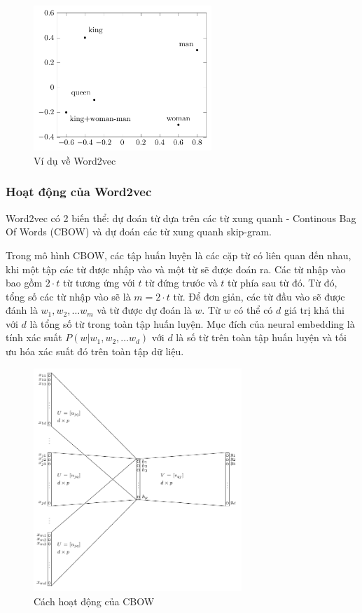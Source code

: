 \begin{figure}[htb]
    \centering
    \includegraphics[width=0.6\textwidth]{tikz_image/word2vec_example.pdf}
    \caption{Ví dụ về Word2vec}
    \label{figure:word2vec-example}
\end{figure}

\subsubsection{Hoạt động của Word2vec}
Word2vec có 2 biến thể: dự đoán từ dựa trên các từ xung quanh - Continous Bag Of Words (CBOW) và dự đoán các từ xung quanh skip-gram.

Trong mô hình CBOW, các tập huấn luyện là các cặp từ có liên quan đến nhau, khi một tập các từ được nhập vào và một từ sẽ được đoán ra. Các từ nhập vào bao gồm $2\cdot t$ từ tương ứng với $t$ từ đứng trước và $t$ từ phía sau từ đó. Từ đó, tổng số các từ nhập vào sẽ là $m = 2\cdot t$ từ. Để đơn giản, các từ đầu vào sẽ được đánh là $w_1, w_2,\dots w_m$  và từ được dự đoán là $w$. Từ $w$ có thể có $d$ giá trị khả thi với $d$ là tổng số từ trong toàn tập huấn luyện. Mục đích của neural embedding là tính xác suất $P(w|w_1,w_2,\dots w_d)$ với $d$ là số từ trên toàn tập huấn luyện và tối ưu hóa xác suất đó trên toàn tập dữ liệu.
\begin{figure}[htbp]
    \centering
    \includegraphics[width=0.7\textwidth]{tikz_image/word2vec_cbow.pdf}
    \caption{Cách hoạt động của CBOW \cite{Aggarwal2022-xj}}
    \label{figure:word2vec-cbow}
\end{figure}

